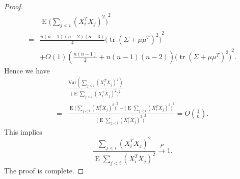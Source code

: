 \documentclass[smallcondensed,final,natbib]{svjour3}          %
\DeclareMathOperator{\mytr}{tr}
\DeclareMathOperator{\myE}{E}
\begin{document}
\begin{proof}
\begin{equation*}
    \begin{aligned}
        &\myE{\big(\sum_{j<i}{(X_i^T X_j)}^2\big)}^2\\
            =&\frac{n(n-1)(n-2)(n-3)}{4}{\big(\mytr (\Sigma+\mu\mu^T)^2\big)}^2\\
            &+O(1)(\frac{n(n-1)}{2}+n(n-1)(n-2)){\big(\mytr (\Sigma+\mu\mu^T)^2\big)}^2.
    \end{aligned}
    \end{equation*}
Hence we have
    \begin{equation*}
    \begin{aligned}
        &\frac{
        \mathrm{Var}(\sum_{j<i}{(X_i^T X_j)}^2)
    }{\big(\myE\sum_{j<i}{(X_i^T X_j)}^2\big)^2}\\
        =&
    \frac{
        \myE{\big(\sum_{j<i}{(X_i^T X_j)}^2\big)}^2-
        {\big(\myE\sum_{j<i}{(X_i^T X_j)}^2\big)}^2
    }{
        {\big(\myE\sum_{j<i}{(X_i^T X_j)}^2\big)}^2
    }
    =O(\frac{1}{n}).
    \end{aligned}
    \end{equation*}
    This implies 
        \begin{equation*}
        \frac{
        \sum_{j<i}{(X_i^T X_j)}^2
    }{\myE\sum_{j<i}{(X_i^T X_j)}^2}\xrightarrow{P}1.
        \end{equation*}
    The proof is complete.
\end{proof}
\end{document}
